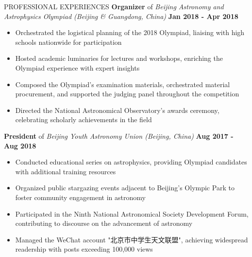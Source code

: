 \documentclass[10pt]{article} %
\begin{document}
\begin{section}{PROFESSIONAL EXPERIENCES}
\textbf{Organizer} of \textit{Beijing Astronomy and Astrophysics Olympiad (Beijing \& Guangdong, China)} \hfill \textbf{Jan 2018 - Apr 2018} 
\begin{itemize}[leftmargin=1.5em]
    \item Orchestrated the logistical planning of the 2018 Olympiad, liaising with high schools nationwide for participation
    \item Hosted academic luminaries for lectures and workshops, enriching the Olympiad experience with expert insights
    \item Composed the Olympiad's examination materials, orchestrated material procurement, and supported the judging panel throughout the competition
    \item Directed the National Astronomical Observatory's awards ceremony, celebrating scholarly achievements in the field
\end{itemize}

\textbf{President} of \textit{Beijing Youth Astronomy Union (Beijing, China)} \hfill \textbf{Aug 2017 - Aug 2018} 
\begin{itemize}[leftmargin=1.5em]
    \item Conducted educational series on astrophysics, providing Olympiad candidates with additional training resources
    \item Organized public stargazing events adjacent to Beijing's Olympic Park to foster community engagement in astronomy
    \item Participated in the Ninth National Astronomical Society Development Forum, contributing to discourse on the advancement of astronomy
    \item Managed the WeChat account "北京市中学生天文联盟", achieving widespread readership with posts exceeding 100,000 views
\end{itemize}

\end{section}
\end{document}

